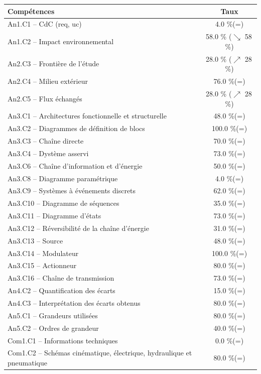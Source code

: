 \footnotesize 
\begin{center} 
\begin{tabular}{|p{.7\linewidth}|c|} 
\hline 
Compétences  & Taux \\ \hline \hline 
An1.C1 -- CdC (req, uc)&4.0 \%(=)\\ \hline 
An1.C2 -- Impact environnemental&58.0 \% ($\searrow$ 58\,\%)\\ \hline 
An2.C3 -- Frontière de l’étude&28.0 \% ($\nearrow$ 28\,\%)\\ \hline 
An2.C4 -- Milieu extérieur&76.0 \%(=)\\ \hline 
An2.C5 -- Flux échangés&28.0 \% ($\nearrow$ 28\,\%)\\ \hline 
An3.C1 -- Architectures fonctionnelle et structurelle&48.0 \%(=)\\ \hline 
An3.C2 -- Diagrammes de définition de blocs&100.0 \%(=)\\ \hline 
An3.C3 -- Chaîne directe&70.0 \%(=)\\ \hline 
An3.C4 -- Dystème asservi&73.0 \%(=)\\ \hline 
An3.C6 -- Chaîne d’information et d'énergie&50.0 \%(=)\\ \hline 
An3.C8 -- Diagramme paramétrique&4.0 \%(=)\\ \hline 
An3.C9 -- Systèmes à événements discrets&62.0 \%(=)\\ \hline 
An3.C10 -- Diagramme de séquences&35.0 \%(=)\\ \hline 
An3.C11 -- Diagramme d’états&73.0 \%(=)\\ \hline 
An3.C12 -- Réversibilité de la chaîne d’énergie&31.0 \%(=)\\ \hline 
An3.C13 -- Source&48.0 \%(=)\\ \hline 
An3.C14 -- Modulateur&100.0 \%(=)\\ \hline 
An3.C15 -- Actionneur&80.0 \%(=)\\ \hline 
An3.C16 -- Chaîne de transmission&73.0 \%(=)\\ \hline 
An4.C2 -- Quantification des écarts&15.0 \%(=)\\ \hline 
An4.C3 -- Interprétation des écarts obtenus&80.0 \%(=)\\ \hline 
An5.C1 -- Grandeurs utilisées &80.0 \%(=)\\ \hline 
An5.C2 -- Ordres de grandeur&40.0 \%(=)\\ \hline 
Com1.C1 -- Informations techniques&0.0 \%(=)\\ \hline 
Com1.C2 -- Schémas cinématique, électrique, hydraulique et pneumatique&80.0 \%(=)\\ \hline 

\end{tabular}
\end{center}
